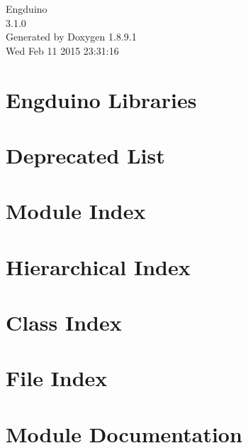 \documentclass[twoside]{book}
\newcommand{\+}{\discretionary{\mbox{\scriptsize$\hookleftarrow$}}{}{}}
\newcommand{\clearemptydoublepage}{%
  \newpage{\pagestyle{empty}\cleardoublepage}%
}
\begin{document}
\hypersetup{pageanchor=false,
             bookmarks=true,
             bookmarksnumbered=true,
             pdfencoding=unicode
            }
\begin{titlepage}
\vspace*{7cm}
\begin{center}%
{\Large Engduino \\[1ex]\large 3.\+1.\+0 }\\
\vspace*{1cm}
{\large Generated by Doxygen 1.8.9.1}\\
\vspace*{0.5cm}
{\small Wed Feb 11 2015 23:31:16}\\
\end{center}
\end{titlepage}
\clearemptydoublepage
\tableofcontents
\clearemptydoublepage
{}
\hypersetup{pageanchor=true}

\chapter{Engduino Libraries}
\label{index}\hypertarget{index}{}
\chapter{Deprecated List}
\label{deprecated}
\hypertarget{deprecated}{}

\chapter{Module Index}

\chapter{Hierarchical Index}

\chapter{Class Index}

\chapter{File Index}

\chapter{Module Documentation}









\end{document}
